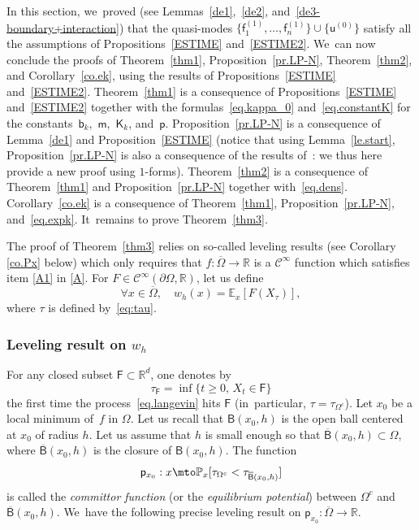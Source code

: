 In this section, we~proved (see Lemmas~\ref{de1},~\ref{de2}, and~\ref{de3-boundary+interaction}) that the quasi-modes $\{\mathsf f_1^{(1)}, \ldots, \mathsf f_n^{(1)}\} \cup \{ \mathsf u^{(0)} \}$ satisfy all the assumptions of
Propositions~\ref{ESTIME} and~\ref{ESTIME2}. We~can now conclude the proofs of Theorem~\ref{thm1}, Proposition~\ref{pr.LP-N}, Theorem~\ref{thm2}, and Corollary~\ref{co.ek}, using the results of Propositions~\ref{ESTIME} and~\ref{ESTIME2}.
Theorem~\ref{thm1} is a consequence of Propositions~\ref{ESTIME}
and~\ref{ESTIME2} together with the formulas~\eqref{eq.kappa_0}
and~\eqref{eq.constantK} for the constants~$\mathsf b_k$,~$\mathsf
m$,~$\mathsf K_k$, and~$\mathsf p$. Proposition~\ref{pr.LP-N} is a
consequence of Lemma~\ref{de1} and
Proposition~\ref{ESTIME} (notice
that using Lemma~\ref{le.start}, Proposition~\ref{pr.LP-N} is also a
consequence of the results of~\cite{DoNe2}: we thus here provide a new
proof using $1$-forms). Theorem~\ref{thm2} is a consequence of
Theorem~\ref{thm1} and Proposition~\ref{pr.LP-N} together
with~\eqref{eq.dens}. Corollary~\ref{co.ek} is a consequence of
Theorem~\ref{thm1}, Proposition~\ref{pr.LP-N},
and~\eqref{eq.expk}. It~remains to prove Theorem~\ref{thm3}.

\label{sec.proof}

The proof of Theorem~\ref{thm3} relies on so-called leveling results (see Corollary \ref{co.Px} below) which only requires that $f:\overline \Omega\to \mathbb R$ is a $\mathcal C^\infty$ function which satisfies item \eqref{A1} in \ref{A}. For $F\in\mathcal C^{\infty}(\partial \Omega,\mathbb R)$, let us define\vspace*{-3pt}
\begin{equation}\label{eq.wh}
\forall x\in \overline
\Omega, \quad
w_h(x)=\mathbb
E_{x} [ F (X_{\tau})],
\end{equation}
where $\tau$ is defined by~\eqref{eq:tau}.

\subsubsection{{Leveling result} on $w_h$}
For any {closed} subset $\mathsf F \subset \mathbb R^d$, one denotes by
\[
\tau_{\mathsf F}=\inf \{ t\geq 0,\, X_t \in \mathsf F
\}
\]
the first time the process~\eqref{eq.langevin} hits $\mathsf F$
(in~particular, $\tau=\tau_{\Omega^c}$).
Let $x_0$ be a local minimum of~$f$ in $\Omega$. Let us recall that ${\mathsf B(x_0,h)}$ is the open ball centered at $x_0$ of radius $h$.
Let us assume that $h$ is small enough so that $ \overline{\mathsf B}(x_0,h)\subset \Omega$, where $ \overline{\mathsf B}(x_0,h)$ is the closure of ${\mathsf B}(x_0,h)$.
The function
\[
\mathsf p_{x_0}: x\mto \mathbb P_{x}[ \tau_{\Omega^c}<\tau_{ \overline{\mathsf B}(x_0,h)}]
\]
is called the \textit{committor function} (or the \textit{equilibrium potential}) between $\Omega^c$ and $ \overline{\mathsf B}(x_0,h)$. We~have the following precise leveling result on $\mathsf p_{x_0}:\overline \Omega\to \mathbb R$.

